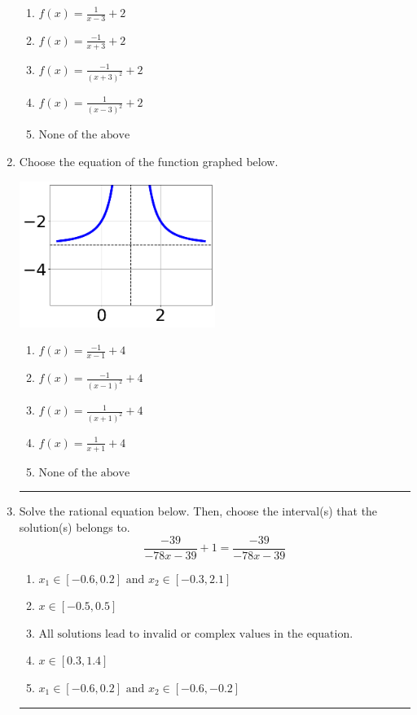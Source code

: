 \documentclass[14pt]{extbook}
\newcommand{\litem}[1]{\item#1\hspace*{-1cm}\rule{\textwidth}{0.4pt}}
\begin{document}
\begin{enumerate}
{\begin{center}
\end{center}
\begin{enumerate}[label=\Alph*.]
\item \( f(x) = \frac{1}{x - 3} + 2 \)
\item \( f(x) = \frac{-1}{x + 3} + 2 \)
\item \( f(x) = \frac{-1}{(x + 3)^2} + 2 \)
\item \( f(x) = \frac{1}{(x - 3)^2} + 2 \)
\item \( \text{None of the above} \)

\end{enumerate} }
\litem{
Choose the equation of the function graphed below.
\begin{center}
    \includegraphics[width=0.5\textwidth]{../Figures/rationalGraphToEquationC.png}
\end{center}
\begin{enumerate}[label=\Alph*.]
\item \( f(x) = \frac{-1}{x - 1} + 4 \)
\item \( f(x) = \frac{-1}{(x - 1)^2} + 4 \)
\item \( f(x) = \frac{1}{(x + 1)^2} + 4 \)
\item \( f(x) = \frac{1}{x + 1} + 4 \)
\item \( \text{None of the above} \)

\end{enumerate} }
\litem{
Solve the rational equation below. Then, choose the interval(s) that the solution(s) belongs to.\[ \frac{-39}{-78x -39} + 1 = \frac{-39}{-78x -39} \]\begin{enumerate}[label=\Alph*.]
\item \( x_1 \in [-0.6, 0.2] \text{ and } x_2 \in [-0.3,2.1] \)
\item \( x \in [-0.5,0.5] \)
\item \( \text{All solutions lead to invalid or complex values in the equation.} \)
\item \( x \in [0.3,1.4] \)
\item \( x_1 \in [-0.6, 0.2] \text{ and } x_2 \in [-0.6,-0.2] \)


\end{enumerate}}
\end{enumerate}
\end{document}
